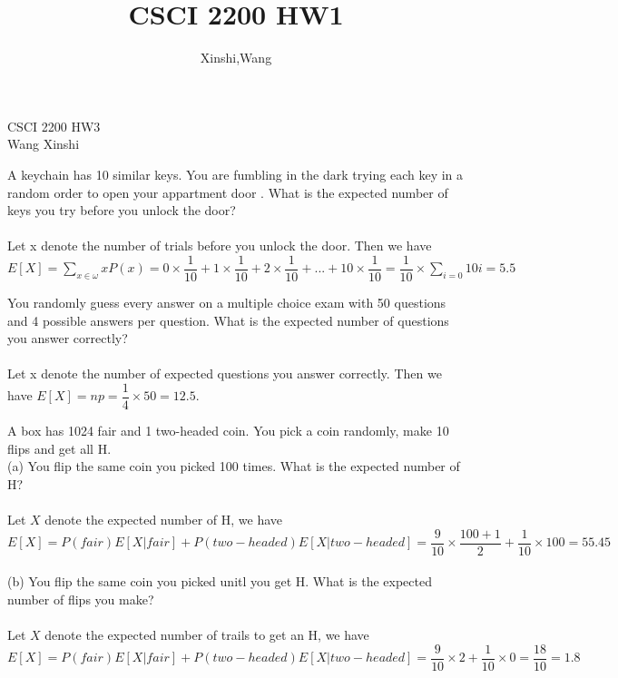 \documentclass{article}
\title{CSCI 2200 HW1}
\author{Xinshi,Wang}
\begin{document}
\noindent
CSCI 2200 HW3\\
Wang Xinshi\\

\begin{addmargin}[2em]{2em}
 A keychain has 10 similar keys. You are fumbling in the dark trying each key in a random order to
open your appartment door . What is the expected number of keys you try before you unlock the door? \\\\
Let x denote the number of trials before you unlock the door. Then we have $E[X] =  \sum_{x \in \omega} xP(x) = 0 \times \dfrac{1}{10} + 1 \times \dfrac{1}{10} + 2 \times \dfrac{1}{10} + ... + 10 \times \dfrac{1}{10} = \dfrac{1}{10} \times \sum_{i=0}{10} i = 5.5$
\end{addmargin}

\clearpage

\begin{addmargin}[2em]{2em}
	 You randomly guess every answer on a multiple choice exam with 50 questions and 4 possible
	answers per question. What is the expected number of questions you answer correctly?\\\\
	Let x denote the number of expected questions you answer correctly. Then we have $E[X] = np = \dfrac{1}{4} \times 50 = 12.5.$
\end{addmargin}
\clearpage


\begin{addmargin}[2em]{2em}
	 A box has 1024 fair and 1 two-headed coin. You pick a coin randomly, make 10 flips and get all H.\\
	(a) You flip the same coin you picked 100 times. What is the expected number of H?\\\\
	Let $X$ denote the expected number of H, we have $E[X] = P(fair)E[X|fair]+P(two-headed)E[X|two-headed] = \dfrac{9}{10}\times \dfrac{100+1}{2} + \dfrac{1}{10} \times 100  = 55.45$\\\\
	(b) You flip the same coin you picked unitl you get H. What is the expected number of flips you make?\\\\
		Let $X$ denote the expected number of trails to get an H, we have $E[X] = P(fair)E[X|fair]+P(two-headed)E[X|two-headed] = \dfrac{9}{10} \times 2 + \dfrac{1}{10} \times 0  = \dfrac{18}{10} = 1.8$\\\\
\end{addmargin}
\end{document}
